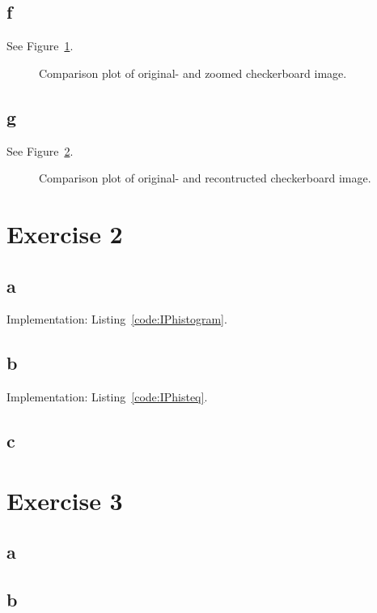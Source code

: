 \documentclass{article}
\begin{document}
\subsection*{f} See Figure~\ref{fig:zoom}.
\begin{figure}[ht]
    \centering
    
    \caption{Comparison plot of original- and zoomed checkerboard image.}
    \label{fig:zoom}
\end{figure}

\subsection*{g} See Figure~\ref{fig:reconstruction}.
\begin{figure}[ht]
    \centering
    
    \caption{Comparison plot of original- and recontructed checkerboard image.}
    \label{fig:reconstruction}
\end{figure}


\section*{Exercise 2}
\subsection*{a}  Implementation: Listing~\ref{code:IPhistogram}.

\subsection*{b}  Implementation: Listing~\ref{code:IPhisteq}.

\subsection*{c}


\section*{Exercise 3}
\subsection*{a}

\subsection*{b}
\end{document}
